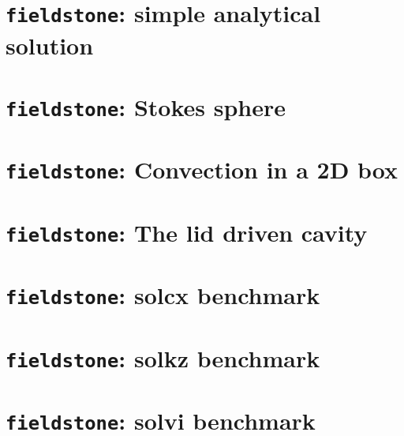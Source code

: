 \documentclass[a4paper]{article}
\begin{document}
\newpage
\section{{\tt fieldstone}: simple analytical solution \label{f1}}


\newpage
\section{{\tt fieldstone}: Stokes sphere }


\newpage
\section{{\tt fieldstone}: Convection in a 2D box}


\newpage
\section{{\tt fieldstone}: The lid driven cavity}



\newpage
\section{{\tt fieldstone}: solcx benchmark}


\newpage
\section{{\tt fieldstone}: solkz benchmark}


\newpage
\section{{\tt fieldstone}: solvi benchmark}

\end{document}
